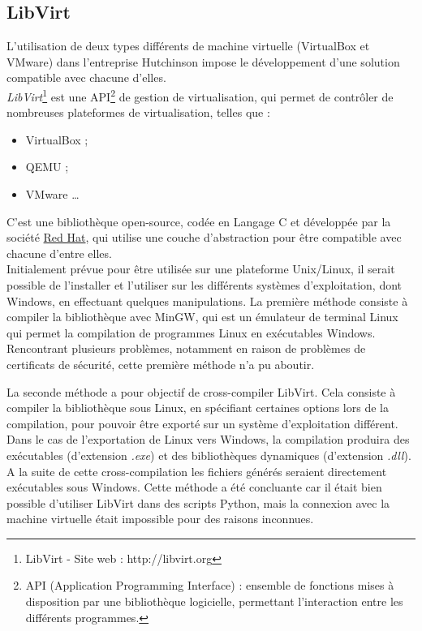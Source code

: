 \subsection{LibVirt}

L'utilisation de deux types différents de machine virtuelle (VirtualBox et VMware) dans l'entreprise Hutchinson impose le développement d'une solution compatible avec chacune d'elles.
\\


\textit{LibVirt}\footnote{LibVirt - Site web : http://libvirt.org} est une API\footnote{API (Application Programming Interface) : ensemble de fonctions mises à disposition par une bibliothèque logicielle, permettant l'interaction entre les différents programmes.} de gestion de virtualisation, qui permet de contrôler de nombreuses plateformes de virtualisation, telles que :
\begin{itemize}
	\item VirtualBox ;
	\item QEMU ;
	\item VMware \ldots
\end{itemize}

C'est une bibliothèque open-source, codée en Langage C et développée par la société \href{http://http://www.redhat.com}{Red Hat}, qui utilise une couche d'abstraction pour être compatible avec chacune d'entre elles.
\\


Initialement prévue pour être utilisée sur une plateforme Unix/Linux, il serait possible de l'installer et l'utiliser sur les différents systèmes d'exploitation, dont Windows, en effectuant quelques manipulations.
La première méthode consiste à compiler la bibliothèque avec MinGW, qui est un émulateur de terminal Linux qui permet la compilation de programmes Linux en exécutables Windows.
Rencontrant plusieurs problèmes, notamment en raison de problèmes de certificats de sécurité, cette première méthode n'a pu aboutir.

La seconde méthode a pour objectif de cross-compiler LibVirt. Cela consiste à compiler la bibliothèque sous Linux, en spécifiant certaines options lors de la compilation, pour pouvoir être exporté sur un système d'exploitation différent. Dans le cas de l'exportation de Linux vers Windows, la compilation produira des exécutables (d'extension \textit{.exe}) et des bibliothèques dynamiques (d'extension \textit{.dll}). A la suite de cette cross-compilation les fichiers générés seraient directement exécutables sous Windows. 
Cette méthode a été concluante car il était bien possible d'utiliser LibVirt dans des scripts Python, mais la connexion avec la machine virtuelle était impossible pour des raisons inconnues.
\\




